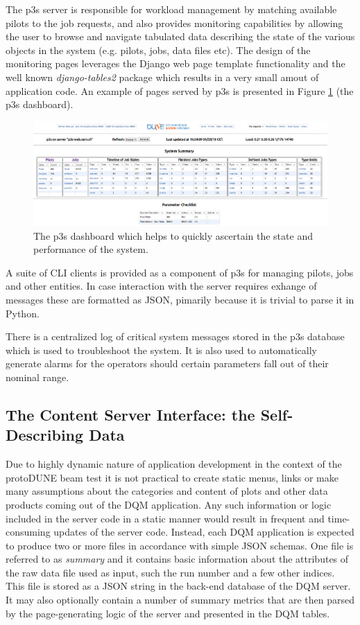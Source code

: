 \documentclass{webofc}
\newcommand{\pd}{protoDUNE\xspace}
\begin{document}
The p3s server is responsible for workload management by matching available pilots to the job requests,
and also provides monitoring capabilities by allowing the user to browse and navigate
tabulated data describing the state of the various objects in the system (e.g. pilots, jobs, data files etc).
The design of the monitoring pages leverages the Django web page template functionality and
the well known \textit{django-tables2} package which results
in a very small amout of application code. An example of pages served by p3s is
presented in Figure \ref{fig:p3s_dash} (the p3s dashboard).

\begin{figure}[tb]
\centering\includegraphics[width=1.0\textwidth]{figures/p3s_dash_2018_v1.png}
\caption{\label{fig:p3s_dash}The p3s dashboard which helps to quickly ascertain
the state and performance of the system.}
\end{figure}

 A suite of CLI clients is provided as a component of p3s for managing pilots, jobs and
other entities. In case interaction with the server requires exhange of messages these are
formatted as JSON, pimarily because it is trivial to parse it in Python.

There is a centralized log of critical system messages stored in the p3s database which
is used to troubleshoot the system. It is also used to automatically generate alarms
for the operators should certain parameters fall out of their nominal range.

\subsection{The Content Server Interface: the Self-Describing Data}
Due to highly dynamic nature of application development in the context of the \pd beam
test it is not practical to create static menus, links or make many assumptions about
the categories and content of plots and other data products coming out of the DQM
application. Any such information or logic included in the server code in a static manner
would result in frequent and time-consuming updates of the server code. Instead,
each DQM application is expected to produce two or more files in accordance
with simple JSON schemas. One file is referred to as \textit{summary} and it contains basic
information about the attributes of the raw data file used as input, such the run number
and a few other indices. This file is stored as a JSON string in the back-end database
of the DQM server. It may also optionally contain a number of summary metrics
that are then parsed by the page-generating logic of the server and presented
in the DQM tables.
\end{document}
